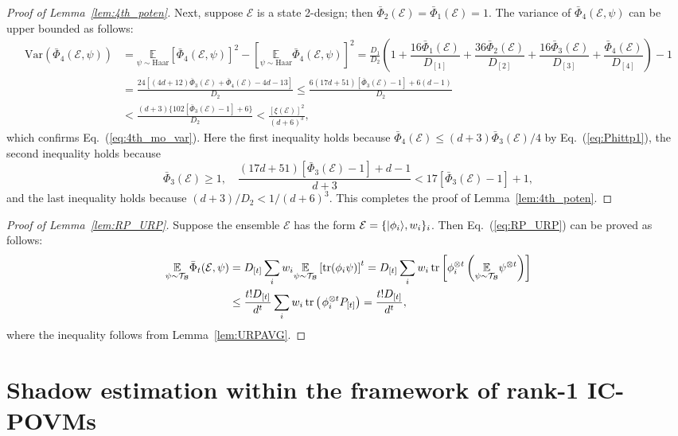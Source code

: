 \documentclass[aps,pra,twocolumn,nofootinbib,superscriptaddress,10pt]{revtex4-2}
\DeclarePairedDelimiter{\ket}{\lvert}{\rangle}
\DeclareMathOperator{\tr}{tr}
\newcommand{\Ha}{\mathrm{Haar}}
\newcommand{\Var}{\mathrm{Var}}
\newcommand{\lsp}{\mkern 2mu}           %
\newcommand{\bbE}{\mathbb{E}}
\newcommand{\caB}{\mathcal{B}}
\newcommand{\caE}{\mathcal{E}}
\newcommand{\caT}{\mathcal{T}}
\newcommand{\bPhi}{\bar{\Phi}}
\newcommand{\eref}[1]{Eq.~\textup{(\ref{#1})}}
\newcommand{\lref}[1]{Lemma~\ref{#1}}
\begin{document}
\begin{proof}[Proof of \lref{lem:4th_poten}]
Next, suppose $\caE$ is a state 2-design; then $\bPhi_2(\caE)=\bPhi_1(\caE)=1$. The variance of $\bPhi_4(\caE,\psi)$ can be upper bounded as follows:
\begin{align}
\Var(\bPhi_4(\caE,\psi)) &= \underset{\psi\sim \Ha}{\bbE} \left[\bPhi_4(\caE,\psi)\right]^2-\left[\underset{\psi\sim \Ha}{\bbE}\bPhi_4(\caE,\psi)\right]^2=\frac{D_1}{D_2}\left(1+\dfrac{16\bPhi_1(\caE)}{D_{[1]}}+\dfrac{36\bPhi_2(\caE)}{D_{[2]}}+\dfrac{16\bPhi_3(\caE)}{D_{[3]}}+\dfrac{\bPhi_4(\caE)}{D_{[4]}}\right)-1\nonumber\\
&=\frac{24[(4d+12)\bPhi_3(\caE)+\bPhi_4(\caE)-4d-13]}{D_2}\le \frac{6(17d+51)[\bPhi_3(\caE)-1]+6(d-1)}{D_2}\nonumber\\
&<\frac{(d+3)\{102[\bPhi_3(\caE)-1]+6\}}{D_2} <\frac{[\xi(\caE)]^2}{(d+6)^3},
\end{align}
which confirms \eref{eq:4th_mo_var}. Here the first inequality holds because $\bPhi_4(\caE)\le {(d+3)\bPhi_3(\caE)}/{4}$ by \eref{eq:Phittp1}, the second inequality holds because
\begin{equation}
\bPhi_3(\caE)\ge 1,\quad \frac{(17d+51)[\bPhi_3(\caE)-1]+d-1}{d+3}<17[\bPhi_3(\caE)-1]+1,
\end{equation}
and the last inequality holds because $(d+3)/D_2<1/(d+6)^3$. This completes the proof of \lref{lem:4th_poten}.
\end{proof}

\begin{proof}[Proof of \lref{lem:RP_URP}]
Suppose the ensemble $\caE$ has the form $\caE=\{\ket{\phi_i},w_i\}_i$. Then \eref{eq:RP_URP} can be proved as follows:
\begin{align}
     \underset{\psi\sim \caT_\caB}{\bbE}\bPhi_t(\caE, \psi)&=D_{[t]}\sum_iw_i\underset{\psi\sim \caT_\caB}{\bbE}\left[\tr(\phi_i\psi)\right]^t=D_{[t]}\sum_iw_i\tr\left[\phi_i^{\otimes t}\left( \underset{\psi\sim \caT_\caB}{\bbE}\psi^{\otimes t}\right)\right]\nonumber\\&\le \frac{t! D_{[t]}}{d^t}\sum_iw_i\tr\left(\lsp\phi_i^{\otimes t}P_{[t]}\right)=\frac{t! D_{[t]}}{d^t},
\end{align}
where the inequality follows from \lref{lem:URPAVG}.
\end{proof}



\section{Shadow estimation within the framework of rank-1 IC-POVMs}
\label{sup:shadow_esti}
\end{document}
